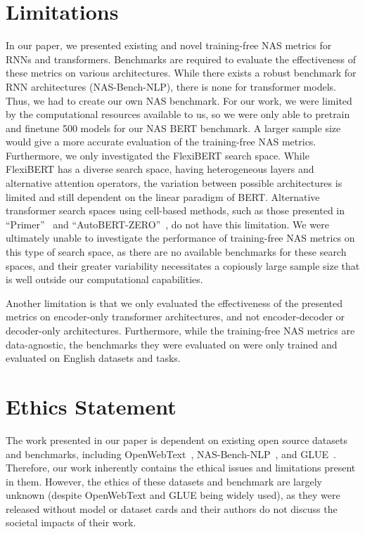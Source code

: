 \documentclass[11pt]{article}
\begin{document}
\section{Limitations}
    In our paper, we presented existing and novel training-free NAS metrics for RNNs and transformers. Benchmarks are required to evaluate the effectiveness of these metrics on various architectures. While there exists a robust benchmark for RNN architectures (NAS-Bench-NLP), there is none for transformer models. Thus, we had to create our own NAS benchmark. For our work, we were limited by the computational resources available to us, so we were only able to pretrain and finetune 500 models for our NAS BERT benchmark. A larger sample size would give a more accurate evaluation of the training-free NAS metrics. Furthermore, we only investigated the FlexiBERT search space. While FlexiBERT has a diverse search space, having heterogeneous layers and alternative attention operators, the variation between possible architectures is limited and still dependent on the linear paradigm of BERT. Alternative transformer search spaces using cell-based methods, such as those presented in ``Primer''~\cite{so_searching_2021} and ``AutoBERT-ZERO''~\cite{gao_autobert-zero_2022}, do not have this limitation. We were ultimately unable to investigate the performance of training-free NAS metrics on this type of search space, as there are no available benchmarks for these search spaces, and their greater variability necessitates a copiously large sample size that is well outside our computational capabilities.

    Another limitation is that we only evaluated the effectiveness of the presented metrics on encoder-only transformer architectures, and not encoder-decoder or decoder-only architectures. Furthermore, while the training-free NAS metrics are data-agnostic, the benchmarks they were evaluated on were only trained and evaluated on English datasets and tasks.

\section{Ethics Statement}
    The work presented in our paper is dependent on existing open source datasets and benchmarks, including OpenWebText~\cite{gokaslan_openwebtext_2019}, NAS-Bench-NLP~\cite{klyuchnikov_nas-bench-nlp_2022}, and GLUE~\cite{wang_glue_2019}. Therefore, our work inherently contains the ethical issues and limitations present in them. However, the ethics of these datasets and benchmark are largely unknown (despite OpenWebText and GLUE being widely used), as they were released without model or dataset cards and their authors do not discuss the societal impacts of their work.
\end{document}
